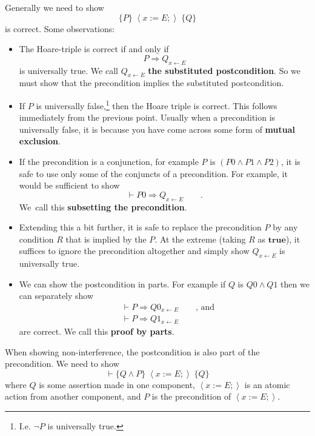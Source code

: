 \documentclass[11pt]{article}%
\begin{document}
Generally we need to show%
\[
\{P\}\;\left\langle x:=E;\right\rangle \;\{Q\}
\]
is correct. Some observations:

\begin{itemize}
\item The Hoare-triple is correct if and only if%
\[
P\Rightarrow Q_{x\leftarrow E}%
\]
is universally true. We call $Q_{x\leftarrow E}$ \textbf{the substituted
postcondition}. So we must show that the precondition implies the substituted postcondition.

\item If $P$ is universally false,\footnote{I.e. $\lnot P$ is universally
true.} then the Hoare triple is correct. This follows immediately from the
previous point. Usually when a precondition is universally false, it is
because you have come across some form of \textbf{mutual exclusion}.

\item If the precondition is a conjunction, for example $P$ is $\left(
P0\wedge P1\wedge P2\right)  $, it is safe to use only some of the conjuncts
of a precondition. For example, it would be sufficient to show%
\[
\vdash P0\Rightarrow Q_{x\leftarrow E}\qquad\text{.}%
\]
We\ call this \textbf{subsetting the precondition}.

\item Extending this a bit further, it is safe to replace the precondition $P$
by any condition $R$ that is implied by the $P$. At the extreme (taking $R$ as
$\mathbf{true}$), it suffices to ignore the precondition altogether and simply
show $Q_{x\leftarrow E}$ is universally true.

\item We can show the postcondition in parts. For example if $Q$ is $Q0\wedge
Q1$ then we can separately show%
\begin{align*}
&  \vdash P\Rightarrow Q0_{x\leftarrow E}\qquad\text{, and}\\
&  \vdash P\Rightarrow Q1_{x\leftarrow E}%
\end{align*}
are correct. We call this \textbf{proof by parts}.
\end{itemize}

When showing non-interference, the postcondition is also part of the
precondition. We need to show%
\[
\vdash\{Q\wedge P\}\;\left\langle x:=E;\right\rangle \;\{Q\}
\]
where $Q$ is some assertion made in one component, $\left\langle
x:=E;\right\rangle $ is an atomic action from another component, and $P$ is
the precondition of $\left\langle x:=E;\right\rangle $.
\end{document}

